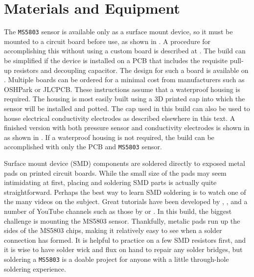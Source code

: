   \section{Materials and Equipment}
  The \texttt{MS5803} sensor is available only as a surface mount device, so it must be mounted to a circuit board before use, as shown in . A procedure for accomplishing this without using a custom board is described at . The build can be simplified if the device is installed on a PCB that includes the requisite pull-up resistors and decoupling capacitor. The design for such a board is available on . Multiple boards can be ordered for a minimal cost from manufacturers such as OSHPark or JLCPCB.
  These instructions assume that a waterproof housing is required. The housing is most easily built using a 3D printed cap into which the sensor will be installed and potted. The cap used in this build can also be used to house electrical conductivity electrodes as described elsewhere in this text. A finished version with both pressure sensor and conductivity electrodes is shown in as shown in . If a waterproof housing is not required, the build can be accomplished with only the PCB and \texttt{MS5803} sensor.

  \begin{kaobox}[frametitle=Soldering Surface Mount Devices]
  	Surface mount device (SMD) components are soldered directly to exposed metal pads on printed circuit boards. While the small size of the pads may seem intimidating at first, placing and soldering SMD parts is actually quite straightforward. Perhaps the best way to learn SMD soldering is to watch one of the many videos on the subject. Great tutorials have been developed by , , and a number of YouTube channels such as those by  or . In this build, the biggest challenge is mounting the MS5803 sensor. Thankfully, metalic pads run up the sides of the MS5803 chips, making it relatively easy to see when a solder connection has formed. It is helpful to practice on a few SMD resistors first, and it is wise to have solder wick and flux on hand to repair any solder bridges, but soldering a \texttt{MS5803} is a doable project for anyone with a little through-hole soldering experience.
  \end{kaobox}


